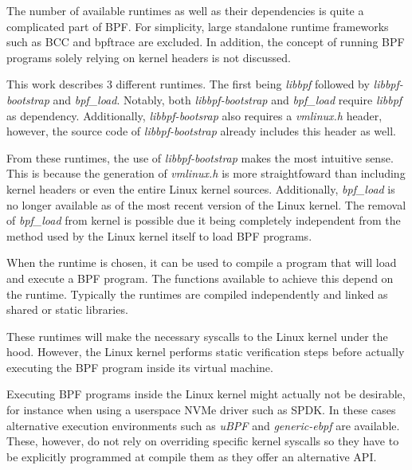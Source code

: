 \documentclass[conference]{IEEEtran}
\begin{document}
The number of available runtimes as well as their dependencies is quite a
complicated part of BPF. For simplicity, large standalone runtime frameworks
such as BCC and bpftrace are excluded. In addition, the concept of running BPF
programs solely relying on kernel headers is not discussed.

This work describes 3 different runtimes. The first being \textit{libbpf}
followed by \textit{libbpf-bootstrap} and \textit{bpf\_load}. Notably,
both \textit{libbpf-bootstrap} and \textit{bpf\_load} require \textit{libbpf}
as dependency. Additionally, \textit{libbpf-bootsrap} also requires a
\textit{vmlinux.h} header, however, the source code of \textit{libbpf-bootstrap}
already includes this header as well.

From these runtimes, the use of \textit{libbpf-bootstrap} makes the most
intuitive sense. This is because the generation of \textit{vmlinux.h} is more
straightfoward than including kernel headers or even the entire Linux kernel
sources. Additionally, \textit{bpf\_load} is no longer available as of the most
recent version of the Linux kernel. The removal of \textit{bpf\_load} from
kernel is possible due it being completely independent from the method used by
the Linux kernel itself to load BPF programs.

When the runtime is chosen, it can be used to compile a program that will load
and execute a BPF program. The functions available to achieve this depend on
the runtime. Typically the runtimes are compiled independently and linked as
shared or static libraries.

These runtimes will make the necessary syscalls to the Linux kernel under the
hood. However, the Linux kernel performs static verification steps before
actually executing the BPF program inside its virtual machine.

Executing BPF programs inside the Linux kernel might actually not be desirable,
for instance when using a userspace NVMe driver such as SPDK. In these cases
alternative execution environments such as \textit{uBPF}\cite{ubpf} and
\textit{generic-ebpf}\cite{generic-ebpf} are available. These, however, do not
rely on overriding specific kernel syscalls so they have to be explicitly
programmed at compile them as they offer an alternative API.

\onecolumn
\end{document}

